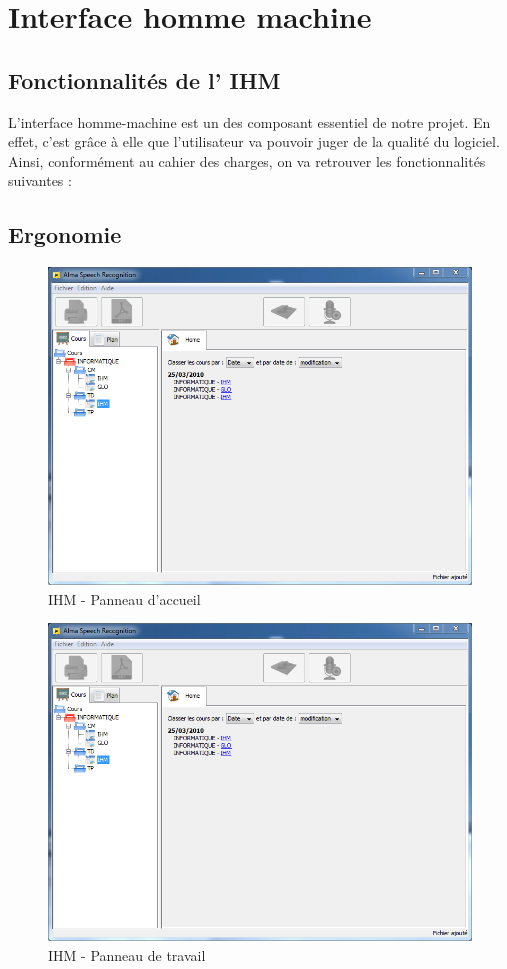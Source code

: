 
\chapter{Interface homme machine}

\section{Fonctionnalités de l' IHM}

L'interface homme-machine est un des composant essentiel de notre projet. En effet, c'est grâce à elle que l'utilisateur va pouvoir juger de la qualité du logiciel. Ainsi, conformément au  cahier des charges, on va retrouver les fonctionnalités suivantes :


\section{Ergonomie}

\begin{figure}[h]
 \centering
 \includegraphics[scale=0.6]{./images/homePanel.png}
 \caption{IHM - Panneau d'accueil}
 \label{fig:homePanel}
\end{figure}



\begin{figure}[h]
 \centering
 \includegraphics[scale=0.6]{./images/homePanel.png}
 \caption{IHM - Panneau de travail}
 \label{fig:homePanel}
\end{figure}
